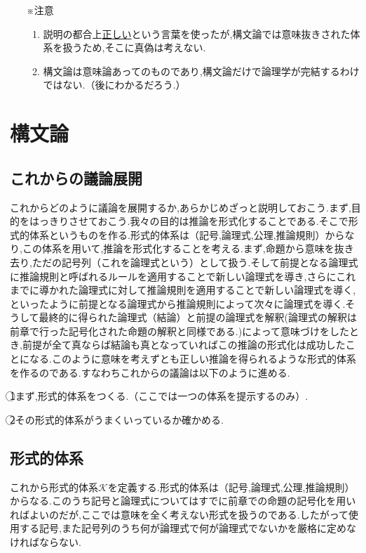 \documentclass[10pt,b5paper,papersize,dvipdfmx]{jsbook}
\begin{document}
\begin{itemize}
\item[※注意]
\begin{enumerate}
\item 説明の都合上\underline{正しい}という言葉を使ったが,構文論では意味抜きされた体系を扱うため,そこに真偽は考えない.
\item 構文論は意味論あってのものであり,構文論だけで論理学が完結するわけではない.（後にわかるだろう.）
\end{enumerate}
\end{itemize}

\section{構文論}
\subsection{これからの議論展開}
これからどのように議論を展開するか,あらかじめざっと説明しておこう.まず,目的をはっきりさせておこう.我々の目的は推論を形式化することである.そこで形式的体系というものを作る.形式的体系は（記号,論理式,公理,推論規則）からなり,この体系を用いて,推論を形式化することを考える.まず,命題から意味を抜き去り,ただの記号列（これを論理式という）として扱う.そして前提となる論理式に推論規則と呼ばれるルールを適用することで新しい論理式を導き,さらにこれまでに導かれた論理式に対して推論規則を適用することで新しい論理式を導く,といったように前提となる論理式から推論規則によって次々に論理式を導く.そうして最終的に得られた論理式（結論）と前提の論理式を解釈(論理式の解釈は前章で行った記号化された命題の解釈と同様である.)によって意味づけをしたとき,前提が全て真ならば結論も真となっていればこの推論の形式化は成功したことになる.このように意味を考えずとも正しい推論を得られるような形式的体系を作るのである.すなわちこれからの議論は以下のように進める. \par
\par
\textcircled{\scriptsize 1}まず,形式的体系をつくる.（ここでは一つの体系を提示するのみ）. \par
\textcircled{\scriptsize 2}その形式的体系がうまくいっているか確かめる. \par

\subsection{形式的体系}
これから形式的体系$\mathcal K$を定義する.形式的体系は（記号,論理式,公理,推論規則）からなる.このうち記号と論理式についてはすでに前章での命題の記号化を用いればよいのだが,ここでは意味を全く考えない形式を扱うのである.したがって使用する記号,また記号列のうち何が論理式で何が論理式でないかを厳格に定めなければならない. 
\end{document}
